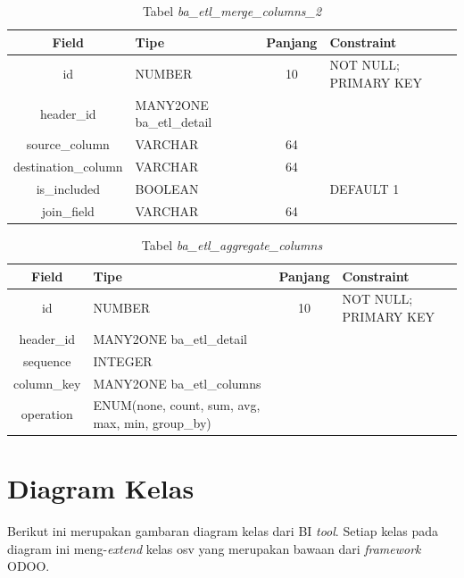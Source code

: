 \begin{table}[H]
	\centering
		\caption{Tabel \textit{ba\_etl\_merge\_columns\_2}}
		\begin{tabular}{ | c | p{4cm} | c | p{4cm} |}
			\hline
				Field & Tipe & Panjang & Constraint \\ \hline \hline
			id & NUMBER & 10 & NOT NULL; PRIMARY KEY  \\ \hline
			header\_id & MANY2ONE ba\_etl\_detail & & \\ \hline 
			source\_column & VARCHAR & 64 &  \\ \hline 
			destination\_column & VARCHAR & 64  &  \\ \hline
			is\_included & BOOLEAN &  & DEFAULT 1 \\ \hline
			join\_field & VARCHAR & 64  &  \\ \hline
		\end{tabular}
\end{table}

\begin{table}[H]
	\centering
		\caption{Tabel \textit{ba\_etl\_aggregate\_columns}}
		\begin{tabular}{ | c | p{4cm} | c | p{4cm} |}
			\hline
				Field & Tipe & Panjang & Constraint \\ \hline \hline
			id & NUMBER & 10 & NOT NULL; PRIMARY KEY  \\ \hline
			header\_id & MANY2ONE ba\_etl\_detail & & \\ \hline 
			sequence & INTEGER &  &  \\ \hline 
			column\_key & MANY2ONE ba\_etl\_columns &  &  \\ \hline
			operation & ENUM(none, count, sum, avg, max, min, group\_by) &  &\\ \hline
		\end{tabular}
\end{table}

\section{Diagram Kelas}
Berikut ini merupakan gambaran diagram kelas dari BI \textit{tool}. Setiap kelas pada diagram ini meng-\textit{extend} kelas osv yang merupakan bawaan dari \textit{framework} ODOO.

